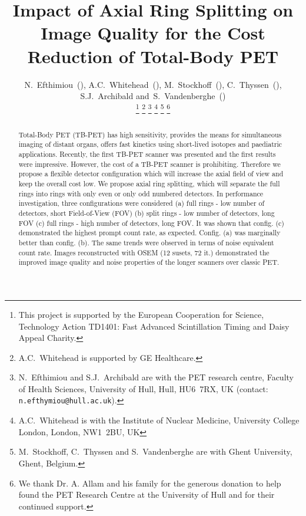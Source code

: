 \documentclass{IEEEtran}
\begin{document}
\title{Impact of Axial Ring Splitting on Image Quality for the Cost Reduction of Total-Body PET}

\author{N.~Efthimiou~(),
        A.C.~Whitehead~(),
        M.~Stockhoff~(), 
        C.~Thyssen~(),
        S.J.~Archibald
        and~S.~Vandenberghe~()%
        
        \vspace{-0.5cm}
        
        \thanks{This project is supported by the European Cooperation for Science, Technology Action TD1401: Fast Advanced Scintillation Timing and Daisy Appeal Charity.}%
        \thanks{A.C.~Whitehead is supported by GE Healthcare.}%
        \thanks{N.~Efthimiou and S.J.~Archibald are with the PET research centre, Faculty of Health Sciences, University of Hull, Hull, HU6~7RX, UK (contact: \texttt{n.efthymiou@hull.ac.uk}).}%
        \thanks{A.C.~Whitehead is with the Institute of Nuclear Medicine, University College London, London, NW1~2BU, UK}%
        \thanks{M.~Stockhoff, C.~Thyssen  and S.~Vandenberghe are with Ghent University, Ghent, Belgium.}%
        \thanks{We thank Dr. A. Allam and his family for the generous donation to help found the PET Research Centre at the University of Hull and for their continued support.}}%

\maketitle
\vspace{-1cm}
    
\IEEEpeerreviewmaketitle
\vspace{-1cm}

\begin{abstract}
Total-Body PET (TB-PET) has high sensitivity, provides the means for simultaneous imaging of distant organs, offers fast kinetics using short-lived isotopes and paediatric applications. Recently, the first TB-PET scanner was presented and the first results were impressive. However, the cost of a TB-PET scanner is prohibiting. Therefore we propose a flexible detector configuration which will increase the axial field of view and keep the overall cost low. We propose axial ring splitting, which will separate the full rings into rings with only even or only odd numbered detectors. In performance investigation, three configurations were considered (a) full rings - low number of detectors, short Field-of-View (FOV) (b) split rings - low number of detectors, long FOV (c) full rings - high number of detectors, long FOV. It was shown that config. (c) demonstrated the highest prompt count rate, as expected. Config. (a) was marginally better than config. (b). The same trends were observed in terms of noise equivalent count rate. Images reconstructed with OSEM (12 susets, 72 it.) demonstrated the improved image quality and noise properties of the longer scanners over classic PET.

\end{abstract}
\end{document}
